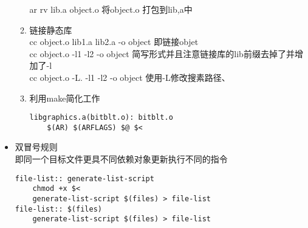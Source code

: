 \begin{itemize}
\begin{enumerate}
			ar rv lib.a object.o 将object.o 打包到lib,a中
			\item 链接静态库\\
			cc object.o lib1.a lib2.a -o object 即链接objet\\
			cc object.o -l1 -l2 -o object 简写形式并且注意链接库的lib前缀去掉了并增加了-l\\
			cc object.o -L.  -l1 -l2 -o object 使用-L修改搜素路径、
			\item 利用make简化工作\\
			\cite[page.43]{MecklenburgNovember2004} 
\begin{lstlisting}
libgraphics.a(bitblt.o): bitblt.o
	$(AR) $(ARFLAGS) $@ $<
\end{lstlisting}			
		\end{enumerate}
	\item 双冒号规则\\
	即同一个目标文件更具不同依赖对象更新执行不同的指令
\begin{lstlisting}
file-list:: generate-list-script
	chmod +x $<
	generate-list-script $(files) > file-list
file-list:: $(files)
	generate-list-script $(files) > file-list
\end{lstlisting}
 \end{itemize}
